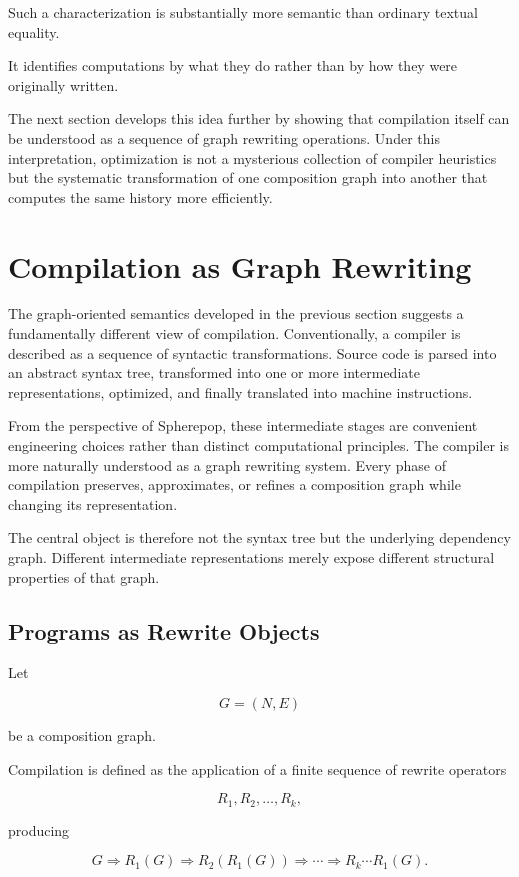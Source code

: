 \documentclass[12pt,oneside]{article}
\begin{document}
Such a characterization is substantially more semantic than ordinary textual equality.

It identifies computations by what they do rather than by how they were originally written.

The next section develops this idea further by showing that compilation itself can be understood as a sequence of graph rewriting operations. Under this interpretation, optimization is not a mysterious collection of compiler heuristics but the systematic transformation of one composition graph into another that computes the same history more efficiently.

\section{Compilation as Graph Rewriting}

The graph-oriented semantics developed in the previous section suggests a fundamentally different view of compilation. Conventionally, a compiler is described as a sequence of syntactic transformations. Source code is parsed into an abstract syntax tree, transformed into one or more intermediate representations, optimized, and finally translated into machine instructions.

From the perspective of Spherepop, these intermediate stages are convenient engineering choices rather than distinct computational principles. The compiler is more naturally understood as a graph rewriting system. Every phase of compilation preserves, approximates, or refines a composition graph while changing its representation.

The central object is therefore not the syntax tree but the underlying dependency graph. Different intermediate representations merely expose different structural properties of that graph.

\subsection{Programs as Rewrite Objects}

Let

\[
G=(N,E)
\]

be a composition graph.

Compilation is defined as the application of a finite sequence of rewrite operators

\[
R_1,R_2,\ldots,R_k,
\]

producing

\[
G
\Longrightarrow
R_1(G)
\Longrightarrow
R_2(R_1(G))
\Longrightarrow
\cdots
\Longrightarrow
R_k\cdots R_1(G).
\]
\end{document}
